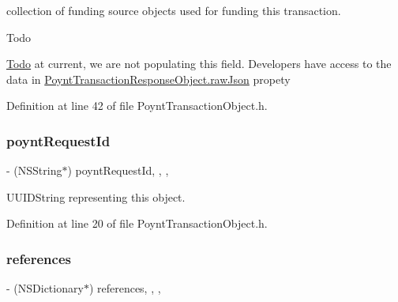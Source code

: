 collection of funding source objects used for funding this transaction. 

\begin{DoxyRefDesc}{Todo}
\item[\hyperlink{todo__todo000002}{Todo}]at current, we are not populating this field. Developers have access to the data in \hyperlink{interface_poynt_transaction_response_object_a0046f618ca04fd1e7fcf91b87190a944}{Poynt\+Transaction\+Response\+Object.\+raw\+Json} propety \end{DoxyRefDesc}


Definition at line 42 of file Poynt\+Transaction\+Object.\+h.

\hypertarget{interface_poynt_transaction_object_af3bd537ec19ed3fac0b5aa56812a1577}{}\label{interface_poynt_transaction_object_af3bd537ec19ed3fac0b5aa56812a1577} 
\subsubsection{\texorpdfstring{poynt\+Request\+Id}{poyntRequestId}}
{\footnotesize\ttfamily -\/ (N\+S\+String$\ast$) poynt\+Request\+Id\hspace{0.3cm}{\ttfamily [read]}, {\ttfamily [write]}, {\ttfamily [nonatomic]}, {\ttfamily [copy]}}



U\+U\+I\+D\+String representing this object. 



Definition at line 20 of file Poynt\+Transaction\+Object.\+h.

\hypertarget{interface_poynt_transaction_object_a2bdc3d5a4da018a352f33b946a0ea384}{}\label{interface_poynt_transaction_object_a2bdc3d5a4da018a352f33b946a0ea384} 
\subsubsection{\texorpdfstring{references}{references}}
{\footnotesize\ttfamily -\/ (N\+S\+Dictionary$\ast$) references\hspace{0.3cm}{\ttfamily [read]}, {\ttfamily [write]}, {\ttfamily [nonatomic]}, {\ttfamily [strong]}}



